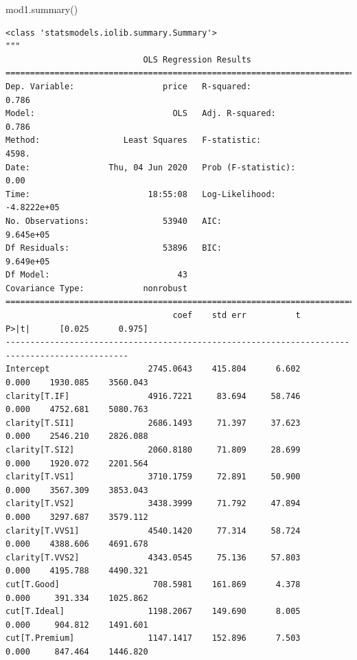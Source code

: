 \documentclass[
  letterpaper,
]{scrbook}
\newenvironment{Shaded}{\begin{snugshade}}{\end{snugshade}}
\newcommand{\NormalTok}[1]{#1}
\begin{document}
\begin{Shaded}
\begin{Highlighting}[]
\NormalTok{mod1.summary()}
\end{Highlighting}
\end{Shaded}

\begin{verbatim}
<class 'statsmodels.iolib.summary.Summary'>
"""
                            OLS Regression Results                            
==============================================================================
Dep. Variable:                  price   R-squared:                       0.786
Model:                            OLS   Adj. R-squared:                  0.786
Method:                 Least Squares   F-statistic:                     4598.
Date:                Thu, 04 Jun 2020   Prob (F-statistic):               0.00
Time:                        18:55:08   Log-Likelihood:            -4.8222e+05
No. Observations:               53940   AIC:                         9.645e+05
Df Residuals:                   53896   BIC:                         9.649e+05
Df Model:                          43                                         
Covariance Type:            nonrobust                                         
===============================================================================================
                                  coef    std err          t      P>|t|      [0.025      0.975]
-----------------------------------------------------------------------------------------------
Intercept                    2745.0643    415.804      6.602      0.000    1930.085    3560.043
clarity[T.IF]                4916.7221     83.694     58.746      0.000    4752.681    5080.763
clarity[T.SI1]               2686.1493     71.397     37.623      0.000    2546.210    2826.088
clarity[T.SI2]               2060.8180     71.809     28.699      0.000    1920.072    2201.564
clarity[T.VS1]               3710.1759     72.891     50.900      0.000    3567.309    3853.043
clarity[T.VS2]               3438.3999     71.792     47.894      0.000    3297.687    3579.112
clarity[T.VVS1]              4540.1420     77.314     58.724      0.000    4388.606    4691.678
clarity[T.VVS2]              4343.0545     75.136     57.803      0.000    4195.788    4490.321
cut[T.Good]                   708.5981    161.869      4.378      0.000     391.334    1025.862
cut[T.Ideal]                 1198.2067    149.690      8.005      0.000     904.812    1491.601
cut[T.Premium]               1147.1417    152.896      7.503      0.000     847.464    1446.820

\end{verbatim}
\end{document}
